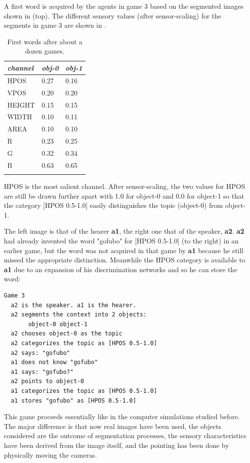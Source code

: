 A first word is acquired by the agents in game 3 
based on the segmented images shown in  (top).
The different sensory values (after sensor-scaling)
for the segments in game 3 are shown in . 
\begin{table}
\begin{center}
\begin{tabular}{ l  l  l }
\lsptoprule
{\it channel}& {\it obj-0} & {\it obj-1}\\ \midrule
HPOS & 0.27 & 0.16\\ \midrule
VPOS & 0.20 & 0.20\\ \midrule
HEIGHT & 0.15 & 0.15\\ \midrule
WIDTH & 0.10 & 0.11\\ \midrule
AREA & 0.10 & 0.10\\ \midrule
R & 0.23 & 0.25\\ \midrule
G & 0.32 & 0.34\\ \midrule
B & 0.63 & 0.65\\ \midrule
\lspbottomrule
\end{tabular}
\caption{ \label{tab:game3b} First words after about a dozen games.}
\end{center}
\end{table}
HPOS is the most salient channel. After sensor-scaling, 
the two values for HPOS are still be drawn further
apart with 1.0 for object-0 and 
0.0 for object-1 so that the category [HPOS 0.5-1.0] easily 
distinguishes the topic (object-0) from object-1.

The left image is that of the hearer {\bf a1}, the right one
that of the speaker, {\bf a2}.
{\bf a2} had already invented the word "gofubo" for 
[HPOS 0.5-1.0] (to the right) in an earlier game, 
but the word was not acquired in that game
by {\bf a1} because he still missed the 
appropriate distinction. Meanwhile the HPOS category 
is available to {\bf a1} due to an
expansion of his discrimination networks
and so he can store the word: 
\begin{verbatim}
Game 3 
  a2 is the speaker. a1 is the hearer. 
  a2 segments the context into 2 objects: 
       object-0 object-1
  a2 chooses object-0 as the topic 
  a2 categorizes the topic as [HPOS 0.5-1.0]
  a2 says: "gofubo"
  a1 does not know "gofubo"
  a1 says: "gofubo?"
  a2 points to object-0
  a1 categorizes the topic as [HPOS 0.5-1.0]
  a1 stores "gofubo" as [HPOS 0.5-1.0]
\end{verbatim}
This game proceeds essentially like in the computer
simulations studied before. The major difference is
that now real images have been used, the objects
considered are the outcome of segmentation processes,
the sensory characteristics have been derived from the 
image itself, and the pointing has been done by 
physically moving the cameras. 

